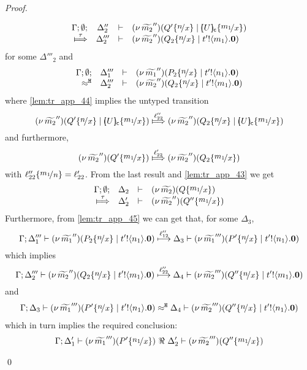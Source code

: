 \begin{proof}
\begin{enumerate}[1.]
\begin{enumerate}[(a)]
\begin{itemize}
\begin{eqnarray}
											\mhorel{\Gamma}{\Delta_2''}{\newsp{\widetilde{m_2}''}{Q' \subst{n}{x} \Par \omapchar{U} \subst{m_1}{x}}}
											{\Hby{\tau}}
											{\Delta_2'''}{}{\newsp{\widetilde{m_2}''}{Q_2 \subst{n}{x} \Par \bout{t'}{m_1} \inact}}
											\label{lem:tr_app_44}
										\end{eqnarray}
										for some $\Delta'''_2$
										and
										\begin{eqnarray}
											\mhorel{\Gamma}{\Delta_1'''}{\newsp{\widetilde{m_1}''}{P_2 \subst{n}{x} \Par \bout{t'}{n_1} \inact}}
											{\hwb}
											{\Delta_2'''}{}{\newsp{\widetilde{m_2}''}{Q_2 \subst{n}{x} \Par \bout{t'}{m_1} \inact}}
											\label{lem:tr_app_45}
										\end{eqnarray}
										where \eqref{lem:tr_app_44} implies the untyped transition
										\[
											\newsp{\widetilde{m_2}''}{Q' \subst{n}{x} \Par \omapchar{U} \subst{m_1}{x}}
											\Hby{ \ell_{22}'' }
											\newsp{\widetilde{m_2}''}{Q_2 \subst{n}{x} \Par \omapchar{U} \subst{m_1}{x}}
										\]
										and furthermore,
										\[
											\newsp{\widetilde{m_2}''}{Q' \subst{m_1}{x}}
											\Hby{ \ell_{22}' }
											\newsp{\widetilde{m_2}''}{Q_2 \subst{m_1}{x}}
										\]
										with $\ell_{22}'' \subst{m_1}{n} = \ell_{22}'$.
										From the last result and \eqref{lem:tr_app_43} we get
										\[
											\mhorel{\Gamma}{\Delta_2}{\newsp{\widetilde{m_2}}{ Q \subst{m_1}{x}   }  }
											{\Hby{\tau}}
											{\Delta_2'}{}{\newsp{\widetilde{m_2}''}{ Q'' \subst{m_1}{x}   }  }
										\]
										Furthermore, from \eqref{lem:tr_app_45} we can get that, for some $\Delta_3$,
										\[
											\horel{\Gamma}{\Delta_1'''}{\newsp{\widetilde{m_1}''}{P_2 \subst{n}{x} \Par \bout{t'}{n_1} \inact}}
											{\hby{\ell_{12}''}}
											{\Delta_3}{\newsp{\widetilde{m_1}'''}{P' \subst{n}{x} \Par \bout{t'}{n_1} \inact}}
										\]
										which implies
										\[
											\horel{\Gamma}{\Delta_2'''}{\newsp{\widetilde{m_2}''}{Q_2 \subst{n}{x} \Par \bout{t'}{m_1} \inact}}
											{\hby{\ell_{22}''}}
											{\Delta_4}{\newsp{\widetilde{m_2}'''}{Q'' \subst{n}{x} \Par \bout{t'}{m_1} \inact}}
										\]
										and
										\begin{eqnarray*}
											\horel{\Gamma}{\Delta_3}{\newsp{\widetilde{m_1}'''}{P' \subst{n}{x} \Par \bout{t'}{n_1} \inact}}
											{\hwb}
											{\Delta_4}{\newsp{\widetilde{m_2}'''}{Q'' \subst{n}{x} \Par \bout{t'}{n_1} \inact}}
										\end{eqnarray*}
										which in turn implies the required conclusion:
										\begin{eqnarray*}											\horel{\Gamma}{\Delta_1'}{\newsp{\widetilde{m_1}'''}{P' \subst{n_1}{x}}}
											{\ \Re\ }
											{\Delta_2'}{\newsp{\widetilde{m_2}'''}{Q'' \subst{m_1}{x}}}
										\end{eqnarray*}
							\end{itemize}
					\end{enumerate}
	\end{enumerate}
	\qed
\end{proof}

